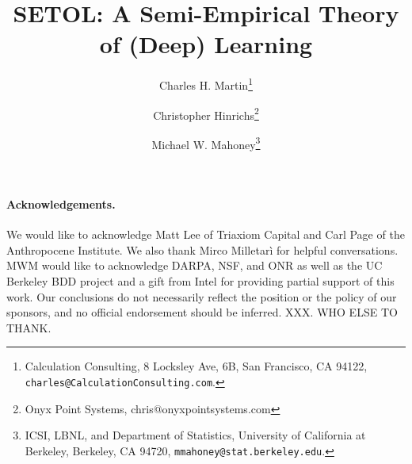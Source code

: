 \documentclass[11pt]{article}
\begin{document}
\title{%
SETOL: A Semi-Empirical Theory of (Deep) Learning
}

\author{%
Charles H. Martin\thanks{Calculation Consulting, 8 Locksley Ave, 6B, San Francisco, CA 94122, \texttt{charles@CalculationConsulting.com}.} 
\and
Christopher Hinrichs\thanks{Onyx Point Systems, chris@onyxpointsystems.com}
\and
Michael W. Mahoney\thanks{ICSI, LBNL, and Department of Statistics, University of California at Berkeley, Berkeley, CA 94720, \texttt{mmahoney@stat.berkeley.edu}.}
}

\date{}
\maketitle

\begin{abstract}

\end{abstract}

\newpage
\tableofcontents


\newpage

\newpage

\newpage

\newpage

\newpage

\newpage

\newpage



\noindent
\paragraph{Acknowledgements.}
We would like to acknowledge Matt Lee of Triaxiom Capital and Carl Page of the Anthropocene Institute.
We also thank Mirco Milletarì for helpful conversations.
MWM would like to acknowledge DARPA, NSF, and ONR as well as the UC Berkeley BDD project and a gift from Intel for providing partial support of this work.
Our conclusions do not necessarily reflect the position or the policy of our sponsors, and no official endorsement should be inferred.
XXX.  WHO ELSE TO THANK.



%
{\small
%

%
}


\appendix


\end{document}
